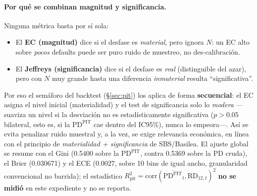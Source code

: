 \documentclass[12pt, a4paper]{article}
\newcommand{\PDPIT}{\ensuremath{\mathrm{PD}^{\mathrm{PIT}}}}
\newcommand{\RD}{\ensuremath{\mathrm{RD}}}
\begin{document}
\paragraph{Por qué se combinan magnitud y significancia.} Ninguna métrica basta por sí sola:
\begin{itemize}[nosep]
  \item El \textbf{EC (magnitud)} dice si el desfase es \emph{material}, pero ignora $N$: un EC alto
    sobre \emph{pocos} defaults puede ser puro ruido de muestreo, no des-calibración.
  \item El \textbf{Jeffreys (significancia)} dice si el desfase es \emph{real} (distinguible
    del azar), pero con $N$ muy grande hasta una diferencia \emph{inmaterial} resulta ``significativa''.
\end{itemize}
Por eso el semáforo del backtest (\S\ref{sec:pit}) los aplica de forma \textbf{secuencial}: el EC
asigna el nivel inicial (materialidad) y el test de significancia solo lo \emph{modera} ---suaviza
un nivel si la desviación no es estadísticamente significativa ($p>0.05$ bilateral, esto es, si la
\PDPIT{} cae dentro del IC95\%), nunca lo empeora---. Así se evita penalizar ruido muestral y, a la
vez, se exige relevancia económica, en línea con el principio de \emph{materialidad +
significancia} de SBS/Basilea. El ajuste global se resume con el Gini (0.5400 sobre la \PDPIT{},
contra 0.5369 sobre la PD cruda), el Brier (0.030671) y el ECE (0.0027, sobre 10 bins de igual
ancho, granularidad convencional no barrida); el estadístico
$R^2_{\text{pit}}=\mathrm{corr}(\overline{\PDPIT}_t,\RD_{12,t})^2$ \textbf{no se midió} en este
expediente y no se reporta.
\end{document}
